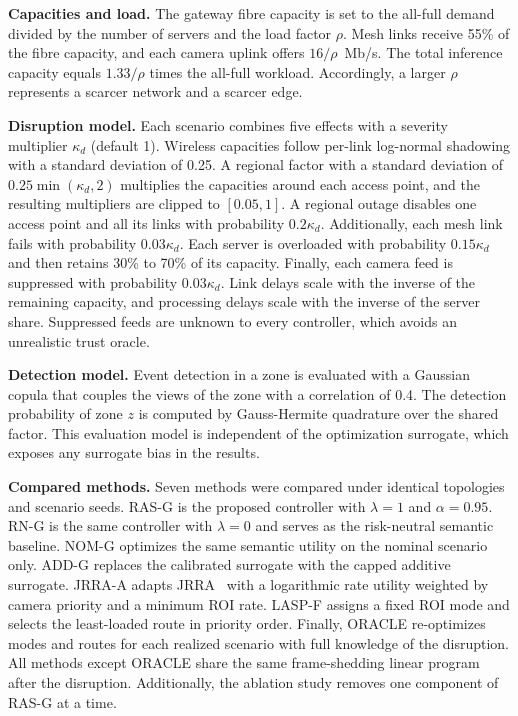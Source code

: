 \documentclass[letterpaper,journal]{IEEEtran}
\begin{document}
\textbf{Capacities and load.} The gateway fibre capacity is set to the all-full demand divided by the number of servers and the load factor $\rho$. Mesh links receive 55\% of the fibre capacity, and each camera uplink offers $16/\rho$~Mb/s. The total inference capacity equals $1.33/\rho$ times the all-full workload. Accordingly, a larger $\rho$ represents a scarcer network and a scarcer edge.

\textbf{Disruption model.} Each scenario combines five effects with a severity multiplier $\kappa_d$ (default 1). Wireless capacities follow per-link log-normal shadowing with a standard deviation of 0.25. A regional factor with a standard deviation of $0.25\min(\kappa_d,2)$ multiplies the capacities around each access point, and the resulting multipliers are clipped to $[0.05,1]$. A regional outage disables one access point and all its links with probability $0.2\kappa_d$. Additionally, each mesh link fails with probability $0.03\kappa_d$. Each server is overloaded with probability $0.15\kappa_d$ and then retains 30\% to 70\% of its capacity. Finally, each camera feed is suppressed with probability $0.03\kappa_d$. Link delays scale with the inverse of the remaining capacity, and processing delays scale with the inverse of the server share. Suppressed feeds are unknown to every controller, which avoids an unrealistic trust oracle.

\textbf{Detection model.} Event detection in a zone is evaluated with a Gaussian copula that couples the views of the zone with a correlation of 0.4. The detection probability of zone $z$ is computed by Gauss-Hermite quadrature over the shared factor. This evaluation model is independent of the optimization surrogate, which exposes any surrogate bias in the results.

\textbf{Compared methods.} Seven methods were compared under identical topologies and scenario seeds. RAS-G is the proposed controller with $\lambda=1$ and $\alpha=0.95$. RN-G is the same controller with $\lambda=0$ and serves as the risk-neutral semantic baseline. NOM-G optimizes the same semantic utility on the nominal scenario only. ADD-G replaces the calibrated surrogate with the capped additive surrogate. JRRA-A adapts JRRA~\cite{ababneh2012} with a logarithmic rate utility weighted by camera priority and a minimum ROI rate. LASP-F assigns a fixed ROI mode and selects the least-loaded route in priority order. Finally, ORACLE re-optimizes modes and routes for each realized scenario with full knowledge of the disruption. All methods except ORACLE share the same frame-shedding linear program after the disruption. Additionally, the ablation study removes one component of RAS-G at a time.
\end{document}
